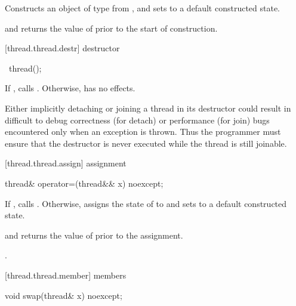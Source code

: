 \begin{itemdescr}
\pnum
\effects Constructs an object of type  from , and sets
 to a default constructed state.

\pnum
\postconditions {} and  returns the
value of  prior to the start of construction.

\end{itemdescr}

[thread.thread.destr]{ destructor}

%
\begin{itemdecl}
~thread();
\end{itemdecl}

\begin{itemdescr}
\pnum
If , calls . Otherwise, has no effects.
\begin{note} Either implicitly detaching or joining a  thread in its
destructor could result in difficult to debug correctness (for detach) or performance
(for join) bugs encountered only when an exception is thrown. Thus the programmer must
ensure that the destructor is never executed while the thread is still joinable.
\end{note}
\end{itemdescr}

[thread.thread.assign]{ assignment}

%
\begin{itemdecl}
thread& operator=(thread&& x) noexcept;
\end{itemdecl}

\begin{itemdescr}
\pnum
\effects If , calls . Otherwise, assigns the
state of  to  and sets  to a default constructed state.

\pnum
\postconditions {} and  returns the value of
 prior to the assignment.

\pnum
\returns {}.
\end{itemdescr}

[thread.thread.member]{ members}

%
\begin{itemdecl}
void swap(thread& x) noexcept;
\end{itemdecl}

